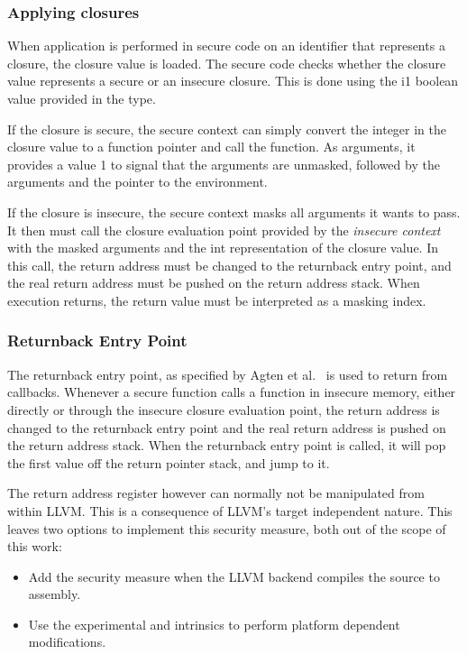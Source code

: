 \subsubsection{Applying closures}
When application is performed in secure code on an identifier that represents a closure, the closure value is loaded.
The secure code checks whether the closure value represents a secure or an insecure closure.
This is done using the i1 boolean value provided in the  type.

If the closure is secure, the secure context can simply convert the integer in the closure value to a function pointer and call the function.
As arguments, it provides a value 1 to signal that the arguments are unmasked, followed by the arguments and the pointer to the environment.

If the closure is insecure, the secure context masks all arguments it wants to pass. It then must call the closure evaluation point provided by the \emph{insecure context} with the masked arguments and the int representation of the closure value.
In this call, the return address must be changed to the returnback entry point, and the real return address must be pushed on the return address stack.
When execution returns, the return value must be interpreted as a masking index.

\subsubsection{Returnback Entry Point}
The returnback entry point, as specified by Agten et al.~\cite{Agten:2012:SCM:2354412.2355247} is used to return from callbacks.
Whenever a secure function calls a function in insecure memory, either directly or through the insecure closure evaluation point, the return address is changed to the returnback entry point and the real return address is pushed on the return address stack. When the returnback entry point is called, it will pop the first value off the return pointer stack, and jump to it.

The return address register however can normally not be manipulated from within LLVM. This is a consequence of LLVM's target independent nature.
This leaves two options to implement this security measure, both out of the scope of this work:
\begin{itemize}
\item 
Add the security measure when the LLVM backend compiles the \LLVMIR source to assembly.

\item 
Use the experimental  and  intrinsics to perform platform dependent modifications.
\end{itemize}



